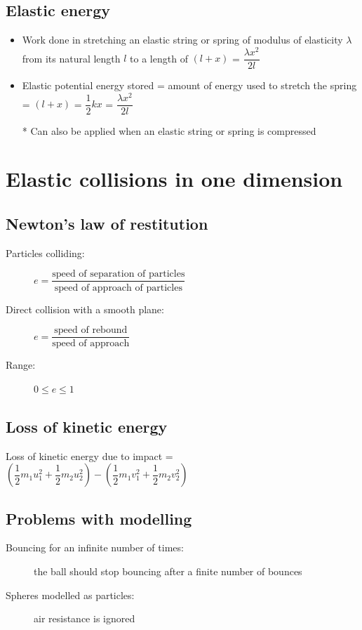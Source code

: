 \documentclass[11pt, A4paper]{article}
\begin{document}
	\subsection{Elastic energy}
	\begin{itemize}
		\item Work done in stretching an elastic string or spring of modulus of elasticity $\lambda$ from its natural length $l$ to a length of $(l+x)$ = $\dfrac{\lambda x^2}{2l}$
		\item Elastic potential energy stored = amount of energy used to stretch the spring = $(l+x)$ = $\dfrac{1}{2}kx$ = $\dfrac{\lambda x^2}{2l}$
		\item[*] Can also be applied when an elastic string or spring is compressed
	\end{itemize}
	
	
	\section[4 Elastic collisions in one dimension]{Elastic collisions in one dimension}
	\subsection{Newton's law of restitution}
	\begin{description}
		\item[Particles colliding:] $e=\dfrac{\text{speed of separation of particles}}{\text{speed of approach of particles}}$
		\item[Direct collision with a smooth plane:] $e=\dfrac{\text{speed of rebound}}{\text{speed of approach}}$
		\item[Range:] $0 \leq e \leq 1$
	\end{description}
	
	\subsection{Loss of kinetic energy}
	Loss of kinetic energy due to impact = $(\dfrac{1}{2}m_1u_1^2+\dfrac{1}{2}m_2u_2^2)-(\dfrac{1}{2}m_1v_1^2+\dfrac{1}{2}m_2v_2^2)$
	
	\subsection{Problems with modelling}
	\begin{description}
		\item[Bouncing for an infinite number of times:] the ball should stop bouncing after a finite number of bounces
		\item[Spheres modelled as particles:] air resistance is ignored
	\end{description}
	
\end{document}

